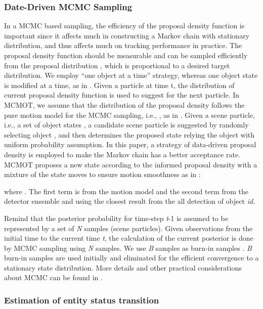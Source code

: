 \documentclass[runningheads]{llncs}
\begin{document}
\subsubsection{Date-Driven MCMC Sampling}

In a MCMC based sampling, the efficiency of the proposal density function is important since it affects much in constructing a Markov chain with stationary distribution, and thus affects much on tracking performance in practice. The proposal density function should be measurable and can be sampled efficiently from the proposal distribution \cite{Ref2}, which is proportional to a desired target distribution. We employ ``one object at a time'' strategy, whereas one object state is modified at a time, as in \cite{Ref2,Ref7}. Given a particle  at time t, the distribution of current proposal density function  is used to suggest for the next particle. In MCMOT, we assume that the distribution of the proposal density follows the pure motion model for the MCMC sampling, i.e., , as in \cite{Ref2}. Given a scene particle, i.e., a set of object states , a candidate scene particle  is suggested by randomly selecting object , and then determines the proposed state  relying the object  with  uniform probability assumption. In this paper, a strategy of data-driven proposal density \cite{Ref3} is employed to make the Markov chain has a better acceptance rate. MCMOT proposes a new state  according to the informed proposal density with a mixture of the state moves to ensure motion smoothness as in \cite{Ref6}: 
 
where . The first term is from the motion model and the second term from the detector ensemble and using the closest result from the all detection of object \textit{id}. 

Remind that the posterior probability for time-step \textit{t}-1 is assumed to be represented by a set of \textit{N} samples (scene particles). Given observations from the initial time to the current time \textit{t}, the calculation of the current posterior is done by MCMC sampling using \textit{N} samples. We use \textit{B} samples as burn-in samples \cite{Ref6}. \textit{B} burn-in samples are used initially and eliminated for the efficient convergence to a stationary state distribution. More details and other practical considerations about MCMC can be found in \cite{Ref42}. 

\subsubsection{Estimation of entity status transition}
\end{document}
